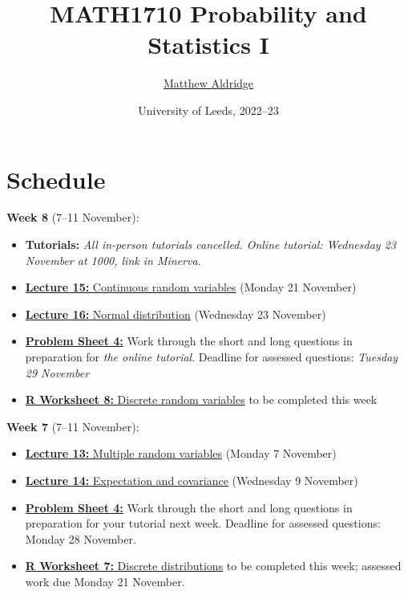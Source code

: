 \documentclass[
  a4paper,
]{book}
\title{MATH1710 Probability and Statistics I}
\author{\href{https://mpaldridge.github.io/math1710}{Matthew Aldridge}}
\date{University of Leeds, 2022--23}
\providecommand{\tightlist}{%
  \setlength{\itemsep}{0pt}\setlength{\parskip}{0pt}}
\theoremstyle{definition}
\theoremstyle{definition}
\theoremstyle{definition}
\theoremstyle{definition}
\theoremstyle{remark}
\begin{document}
\maketitle

{
\setcounter{tocdepth}{1}
\tableofcontents
}
\hypertarget{schedule}{%
\chapter*{Schedule}\label{schedule}}

\newcommand{\Var}{\operatorname{Var}}

\textbf{Week 8} (7--11 November):

\begin{itemize}
\tightlist
\item
  \textbf{Tutorials:} \emph{All in-person tutorials cancelled. Online tutorial: Wednesday 23 November at 1000, link in Minerva.}
\item
  \protect\hyperlink{L15-continuous}{\textbf{Lecture 15:} Continuous random variables} (Monday 21 November)
\item
  \protect\hyperlink{L16-normal}{\textbf{Lecture 16:} Normal distribution} (Wednesday 23 November)
\item
  \protect\hyperlink{P4}{\textbf{Problem Sheet 4:}} Work through the short and long questions in preparation for \emph{the online tutorial}. Deadline for assessed questions: \emph{Tuesday 29 November}
\item
  \protect\hyperlink{r-work}{\textbf{R Worksheet 8:} Discrete random variables} to be completed this week
\end{itemize}

\textbf{Week 7} (7--11 November):

\begin{itemize}
\tightlist
\item
  \protect\hyperlink{L13-multi-rv}{\textbf{Lecture 13:} Multiple random variables} (Monday 7 November)
\item
  \protect\hyperlink{L14-covariance}{\textbf{Lecture 14:} Expectation and covariance} (Wednesday 9 November)
\item
  \protect\hyperlink{P4}{\textbf{Problem Sheet 4:}} Work through the short and long questions in preparation for your tutorial next week. Deadline for assessed questions: Monday 28 November.
\item
  \protect\hyperlink{r-work}{\textbf{R Worksheet 7:} Discrete distributions} to be completed this week; assessed work due Monday 21 November.
\end{itemize}
\end{document}
